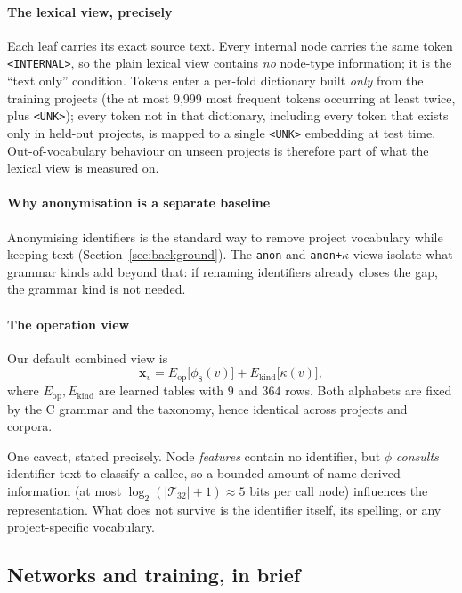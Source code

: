 \documentclass[pdflatex,sn-basic]{sn-jnl}
\theoremstyle{thmstyleone}%
\begin{document}
\paragraph{The lexical view, precisely} Each leaf carries its exact source
text. Every internal node carries the same token \texttt{<INTERNAL>}, so the
plain lexical view contains \emph{no} node-type information; it is the
``text only'' condition. Tokens enter a per-fold dictionary built \emph{only}
from the training projects (the at most 9{,}999 most frequent tokens occurring at
least twice, plus \texttt{<UNK>}); every token not in that dictionary, including every token that
exists only in held-out projects, is mapped to a single \texttt{<UNK>}
embedding at test time. Out-of-vocabulary behaviour on unseen projects is
therefore part of what the lexical view is measured on.

\paragraph{Why anonymisation is a separate baseline} Anonymising identifiers
is the standard way to remove project vocabulary while keeping text
(Section~\ref{sec:background}). The \texttt{anon} and \texttt{anon+$\kappa$}
views isolate what grammar kinds add beyond that: if renaming identifiers
already closes the gap, the grammar kind is not needed.

\paragraph{The operation view} Our default combined view is
\begin{equation}
    \mathbf{x}_v = E_{\mathrm{op}}\big[\phi_8(v)\big]
                 + E_{\mathrm{kind}}\big[\kappa(v)\big],
\label{eq:features}
\end{equation}
where $E_{\mathrm{op}},E_{\mathrm{kind}}$ are learned tables with $9$ and $364$
rows. Both alphabets are fixed by the C grammar and the taxonomy, hence
identical across projects and corpora.

One caveat, stated precisely. Node \emph{features} contain no identifier, but
$\phi$ \emph{consults} identifier text to classify a callee, so a bounded
amount of name-derived information (at most
$\log_2(|\mathcal{T}_{32}|+1) \approx 5$ bits per call node) influences the
representation. What does not survive is the identifier itself, its spelling,
or any project-specific vocabulary.

\subsection{Networks and training, in brief}
\label{sec:networks}
\end{document}
